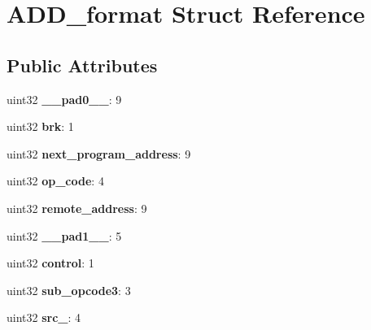 \hypertarget{structADD__format}{}\section{A\+D\+D\+\_\+format Struct Reference}
\label{structADD__format}
\subsection*{Public Attributes}
\begin{DoxyCompactItemize}
\item 
\mbox{\label{structADD__format_a41d8d8c163d21cde345fbe23b9e9f0f1}} 
uint32 {\bfseries \+\_\+\+\_\+pad0\+\_\+\+\_\+}\+: 9
\item 
\mbox{\label{structADD__format_abf7bfcfdee7a75d950e1df71d6ceee74}} 
uint32 {\bfseries brk}\+: 1
\item 
\mbox{\label{structADD__format_a814e68ffb29384f704275dc8fb995889}} 
uint32 {\bfseries next\+\_\+program\+\_\+address}\+: 9
\item 
\mbox{\label{structADD__format_a0c91a6886e72076957261b311ba61746}} 
uint32 {\bfseries op\+\_\+code}\+: 4
\item 
\mbox{\label{structADD__format_a9c1356ac413d2714336c4504730b6c9d}} 
uint32 {\bfseries remote\+\_\+address}\+: 9
\item 
\mbox{\label{structADD__format_aa1224b3a055d475873896cecb298ec4e}} 
uint32 {\bfseries \+\_\+\+\_\+pad1\+\_\+\+\_\+}\+: 5
\item 
\mbox{\label{structADD__format_aa81147ee6289bfcaae66435fe4318922}} 
uint32 {\bfseries control}\+: 1
\item 
\mbox{\label{structADD__format_a6642c5d420cad0117604f1c779179139}} 
uint32 {\bfseries sub\+\_\+opcode3}\+: 3
\item 
\mbox{\label{structADD__format_a48818f29f4d5a95efcf7cef4d22b2c27}} 
uint32 {\bfseries src\+\_}\+: 4
\item 

\end{DoxyCompactItemize}
